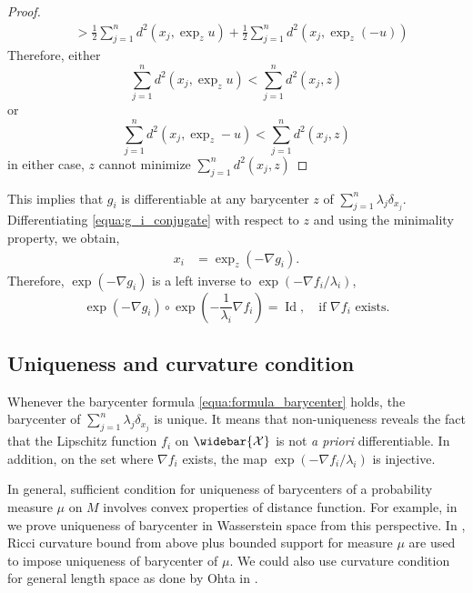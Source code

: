 \begin{proof}
\begin{align*}
		                                                                & > \frac { 1 } { 2 } \sum _ { j = 1 } ^ { n } d ^ { 2 } \left( x _ { j } , \exp _ { z } u \right) + \frac { 1 } { 2 } \sum _ { j = 1 } ^ { n } d ^ { 2 } \left( x _ { j } , \exp _ { z } ( - u ) \right)
	\end{align*}
	Therefore, either
	\[ \sum _ { j = 1 } ^ { n } d ^ { 2 } \left( x _ { j } , \exp _ { z } u \right) < \sum _ { j = 1 } ^ { n } d ^ { 2 } \left( x _ { j } , z \right) \]
	or
	\[ \sum _ { j = 1 } ^ { n } d ^ { 2 } \left( x _ { j } , \exp _ { z } - u \right) < \sum _ { j = 1 } ^ { n } d ^ { 2 } \left( x _ { j } , z \right) \]
	in either case, \( z \) cannot minimize \( \sum _ { j = 1 } ^ { n } d ^ { 2 } \left( x _ { j } , z \right) \)
\end{proof}
This  implies that $g_i$ is differentiable at
any barycenter $z$ of $\sum_{j=1}^n \lambda_j \delta_{x_j}$.
Differentiating \cref{equa:g_i_conjugate} with respect to %
$z$ and using the minimality property, we obtain,
\begin{align*}
	x_i & = \exp_{z}( - \nabla g_i).
\end{align*}
Therefore, $ \exp(- \nabla g_i) $ is a left inverse to $\exp( - \nabla f_i / \lambda_i)$,
\[
	\exp( - \nabla g_i) \circ \exp( - \frac{1}{\lambda_i} \nabla f_i) = \operatorname{Id},
	\quad \text{if } \nabla f_i \text{ exists}.
\]


\subsection{Uniqueness and curvature condition}

\label{section:uniqueness_and_curvature}

Whenever the barycenter formula \cref{equa:formula_barycenter} holds,
the barycenter of $\sum_{j=1}^n \lambda_j \delta_{x_j}$ is unique.
It means that non-uniqueness reveals the fact that the Lipschitz function
$f_i$ on $\widebar{ \mathcal{X} }$ is not \emph{a priori} differentiable.
In addition, on the set where $\nabla f_i$ exists, the map
$\exp( -\nabla f_i / \lambda_i )$ is injective.

In general, sufficient condition for uniqueness of barycenters of a probability measure $\mu$ on $M$
involves convex properties of distance function.
For example, in  we prove uniqueness of barycenter in Wasserstein space
from this perspective.
In \cite[Proposition IX.7.1]{chavel2006riemannian},
Ricci curvature bound from above plus bounded support for measure $\mu$ are used
to impose uniqueness of barycenter of $\mu$.
We could also use curvature condition for general length space as done by Ohta in \cite{ohta2012barycenters}.

